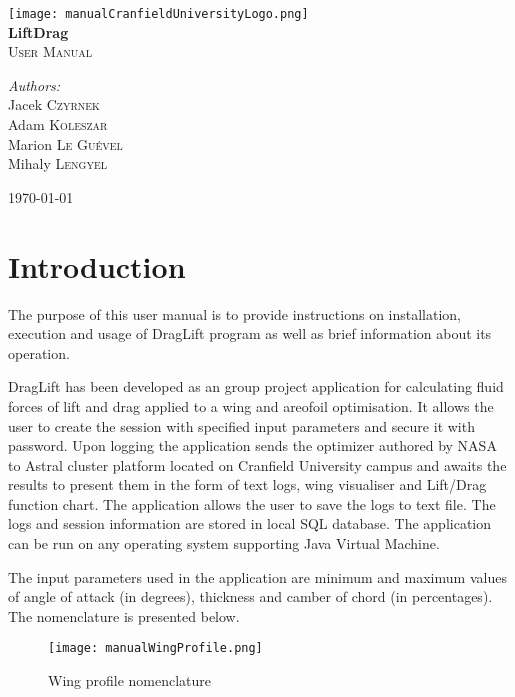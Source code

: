 \documentclass[a4paper,12pt]{article}
\begin{document}
\begin{titlepage}
\begin{center}

\texttt{[image: manualCranfieldUniversityLogo.png]}~\\[5cm]




{ \huge \bfseries LiftDrag \\[0.4cm] }
\textsc{\Large User Manual}\\[2cm]

\noindent
\begin{flushleft} \large
\emph{Authors:}\\
Jacek \textsc{Czyrnek}\\
Adam \textsc{Koleszar}\\
Marion \textsc{Le Guével}\\
Mihaly \textsc{Lengyel}\\
\end{flushleft}


\vfill

{\large \today}

\end{center}
\end{titlepage}

\tableofcontents
\newpage
\section{Introduction}
The purpose of this user manual is to provide instructions on installation, execution and usage of DragLift program as well as brief information about its operation.

DragLift has been developed as an group project application for calculating fluid forces of lift and drag applied to a wing and areofoil optimisation. It allows the user to create the session with specified input parameters and secure it with password. Upon logging the application sends the optimizer authored by NASA to Astral cluster platform located on Cranfield University campus and awaits the results to present them in the form of text logs, wing visualiser and Lift/Drag function chart. The application allows the user to save the logs to text file. The logs and session information are stored in local SQL database. The application can be run on any operating system supporting Java Virtual Machine.

The input parameters used in the application are minimum and maximum values of angle of attack (in degrees), thickness and camber of chord (in percentages). The nomenclature is presented below.
\begin{figure}[h!]
	\centering
\texttt{[image: manualWingProfile.png]}\\
\caption{Wing profile nomenclature}
\end{figure}
\end{document}

